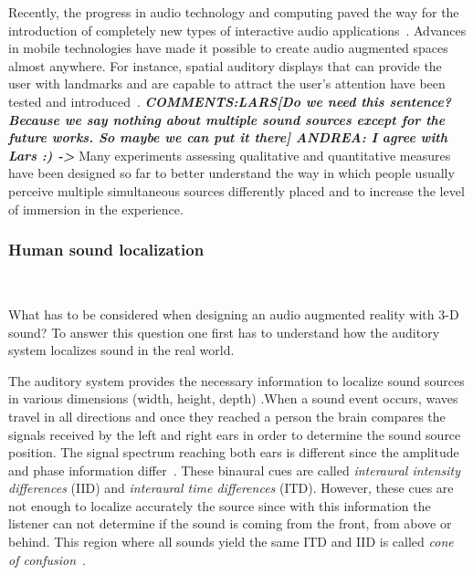 \documentclass[journal]{IEEEtran}
\begin{document}
Recently, the progress in audio technology and computing paved the way for the introduction of completely new types of interactive audio applications~\cite{harma2004}. Advances in mobile technologies have made it possible to create audio augmented spaces almost anywhere. For instance, spatial auditory displays that can provide the user with landmarks and are capable to attract the user's attention have been tested and introduced~\cite{alvarez2011}. \textbf{\emph{COMMENTS:LARS[Do we need this sentence? Because we say nothing about multiple sound sources except for the future works. So maybe we can put it there] ANDREA: I agree with Lars :) ->}} Many experiments assessing qualitative and quantitative measures have been designed so far to better understand the way in which people usually perceive multiple simultaneous sources differently placed and to increase the level of immersion in the experience.\\

\subsubsection*{Human sound localization}~

What has to be considered when designing an audio augmented reality with 3-D sound? To answer this question one first has to understand how the auditory system localizes sound in the real world. 

The auditory system provides the necessary information to localize sound sources in various dimensions (width, height, depth) \cite{Rumsey2001}.When a sound event occurs, waves travel in all directions and once they reached a person the brain compares the signals received by the left and right ears in order to determine the sound source position. The signal spectrum reaching both ears is different since the amplitude and phase information differ~\cite{Rumsey2001}. These binaural cues are called \emph{interaural intensity differences} (IID) and \emph{interaural time differences} (ITD). However, these cues are not enough to localize accurately the source since with this information the listener can not determine if the sound is coming from the front, from above or behind. This region where all sounds yield the same ITD and IID is called \textit{cone of confusion}~\cite{SpatialAudio2007}.
\end{document}
